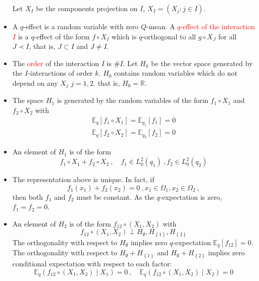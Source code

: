\documentclass[xcolor=svgnames]{beamer}
\newcommand{\condexpat}[3]{\mathbb E_{#1}\left(#2 \middle| #3\right)}
\newcommand{\expectat}[2]{\mathbb E_{#1}\left[#2\right]}
\newcommand{\reals}{\mathbb{R}}
\newcommand{\rosso}[1]{\textcolor{red}{#1}}
\newcommand{\set}[1]{\left\{#1\right\}}
\renewcommand{\emph}{\rosso}
\begin{document}
\begin{frame}
\begin{itemize}
   Let $X_I$ be the components projection on $I$, $X_I = (X_j \colon j \in I)$.
    \item A $q$-effect is a random variable with zero $Q$-mean. A \emph{$q$-effect of the interaction $I$} is a $q$-effect of the form $f\circ X_I$ which is $q$-orthogonal to all $g \circ X_J$ for all $J \prec I$, that is, $J \subset I$ and $J \neq I$.
    \item The \emph{order} of the interaction $I$ is $\# I$. Let $H_k$ be the vector space generated by the $I$-interactions of order $k$. $H_0$ contains random variables which do not depend on any $X_j$ $j=1,2$. that is, $H_0 = \reals$.
    \item The space $H_1$ is generated by the random variables of the form 
        $f_1\circ X_1$ and $f_2\circ X_2$
    with 
    \begin{gather*}
        \expectat q {f_1\circ X_1} = \expectat {q_1} {f_1} = 0 \\
           \expectat q {f_2\circ X_2} = \expectat {q_2} {f_2} = 0 
    \end{gather*}
   \item An element of $H_1$ is of the form
   \begin{equation*}
       f_1\circ X_1 + f_2 \circ X_2 \ , \quad f_1 \in L^2_0(q_1) \ , f_2 \in L^2_0(q_2)
   \end{equation*}
   \item The representation above is unique. In fact, if
   \begin{equation*}
       f_1(x_1) + f_2(x_2) = 0 \ , x_1 \in \Omega_1, x_2 \in \Omega_2 \ ,
   \end{equation*}
   then both $f_1$ and $f_2$ must be constant. As the $q$-expectation is zero, $f_1 = f_2 = 0$.
   \item An element of $H_2$ is of the form $f_{12} \circ(X_1,X_2)$ with
   \begin{equation*}
     f_{12} \circ(X_1,X_2) \perp H_{\emptyset}, H_{\set{1}}, H_{\set{2}}  
   \end{equation*}
   The orthogonality with respect to $H_{\emptyset}$ implies zero $q$-expectation $\expectat q {f_{12}} = 0$. The orthogonality with respect to $H_{\emptyset} + H_{\set{1}}$ and $H_{\emptyset} + H_{\set{2}}$ implies zero conditional expectation with respect to each factor:
   \begin{equation*}
       \condexpat {q} {f_{12} \circ (X_1,X_2)}{X_1} = 0 \ , \quad \condexpat {q} {f_{12} \circ (X_1,X_2)}{X_2} = 0
   \end{equation*}

\end{itemize}
\end{frame}
\end{document}
